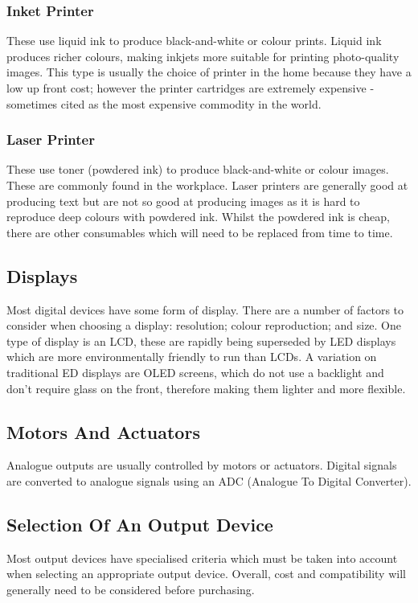 \documentclass[a4paper,11pt, twocolumn]{article}
\begin{document}
\subsubsection{Inket Printer}
These use liquid ink to produce black-and-white or colour prints. Liquid ink produces richer colours, making inkjets more suitable for printing photo-quality images. This type is usually the choice of printer in the home because they have a low up front cost; however the printer cartridges are extremely expensive - sometimes cited as the most expensive commodity in the world.
\subsubsection{Laser Printer}
These use toner (powdered ink) to produce black-and-white or colour images. These are commonly found in the workplace. Laser printers are generally good at producing text but are not so good at producing images as it is hard to reproduce deep colours with powdered ink. Whilst the powdered ink is cheap, there are other consumables which will need to be replaced from time to time. 
\subsection{Displays}
Most digital devices have some form of display. There are a number of factors to consider when choosing a display: resolution; colour reproduction; and size. One type of display is an LCD, these are rapidly being superseded by LED displays which are more environmentally friendly to run than LCDs. A variation on traditional ED displays are OLED screens, which do not use a backlight and don't require glass on the front, therefore making them lighter and more flexible. 
\subsection{Motors And Actuators}
Analogue outputs are usually controlled by motors or actuators. Digital signals are converted to analogue signals using an ADC (Analogue To Digital Converter).
\subsection{Selection Of An Output Device}
Most output devices have specialised criteria which must be taken into account when selecting an appropriate output device. Overall, cost and compatibility will generally need to be considered before purchasing. 
\end{document}
